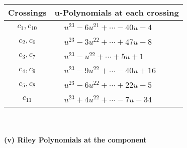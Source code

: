\documentclass[1p]{elsarticle_modified}
\theoremstyle{definition}
\begin{document}
\begin{tabular}{m{50pt}|m{274pt}}
Crossings & \hspace{64pt}u-Polynomials at each crossing \\
\hline $$\begin{aligned}c_{1},c_{10}\end{aligned}$$&$\begin{aligned}
&u^{23}-6 u^{21}+\cdots-40 u-4
\end{aligned}$\\
\hline $$\begin{aligned}c_{2},c_{6}\end{aligned}$$&$\begin{aligned}
&u^{23}-3 u^{22}+\cdots+47 u-8
\end{aligned}$\\
\hline $$\begin{aligned}c_{3},c_{7}\end{aligned}$$&$\begin{aligned}
&u^{23}- u^{22}+\cdots+5 u+1
\end{aligned}$\\
\hline $$\begin{aligned}c_{4},c_{9}\end{aligned}$$&$\begin{aligned}
&u^{23}-9 u^{22}+\cdots-40 u+16
\end{aligned}$\\
\hline $$\begin{aligned}c_{5},c_{8}\end{aligned}$$&$\begin{aligned}
&u^{23}-6 u^{22}+\cdots+22 u-5
\end{aligned}$\\
\hline $$\begin{aligned}c_{11}\end{aligned}$$&$\begin{aligned}
&u^{23}+4 u^{22}+\cdots-7 u-34
\end{aligned}$\\
\hline
\end{tabular}\\~\\
\newpage\renewcommand{\arraystretch}{1}
\flushleft \textbf{(v) Riley Polynomials at the component}\newline \\
\end{document}
